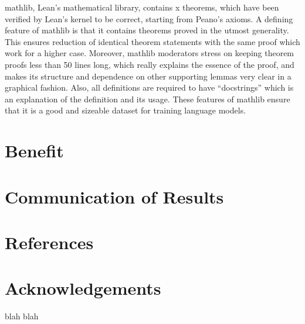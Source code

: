 \documentclass[12pt,reqno,oneside]{amsart}
\begin{document}
mathlib, Lean’s mathematical library, contains x theorems, which have been verified by Lean’s kernel to be correct, starting from Peano’s axioms. A defining feature of mathlib is that it contains theorems proved in the utmost generality. This ensures reduction of identical theorem statements with the same proof which work for a higher case. Moreover, mathlib moderators stress on keeping theorem proofs less than 50 lines long, which really explains the essence of the proof, and makes its structure and dependence on other supporting lemmas very clear in a graphical fashion. Also, all definitions are required to have “docstrings” which is an explanation of the definition and its usage. These features of mathlib ensure that it is a good and sizeable dataset for training language models. 

\section{Benefit}
\section{Communication of Results}
\section{References}
\section{Acknowledgements}
blah blah
\end{document}
